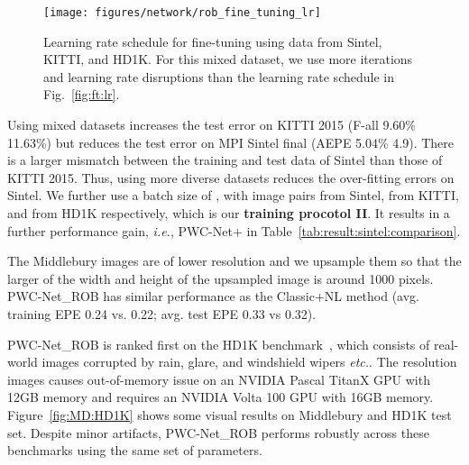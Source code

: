 \documentclass[10pt,journal,cspaper,compsoc]{IEEEtran}
\def\ie{\emph{i.e.}\xspace} \def\Ie{\emph{I.e.}\xspace}
\def\etc{\emph{etc.}\xspace} \def\vs{\emph{vs.}\xspace}
\begin{document}
	\begin{figure}[h]
		\begin{center}	
			\texttt{[image: figures/network/rob\_fine\_tuning\_lr]} 
		\end{center}
		\caption{Learning rate schedule for fine-tuning using data from Sintel, KITTI, and HD1K. For this mixed dataset, we use more iterations and learning rate disruptions than the learning rate schedule in Fig.~\ref{fig:ft:lr}.}
		\label{fig:rob:lr}
	\end{figure}
	
	
	Using mixed datasets increases the test error on KITTI 2015 (F-all 9.60\%  11.63\%) but reduces the test error on MPI Sintel final (AEPE 5.04\%  4.9). There is a larger mismatch between the training and test data of Sintel than those of KITTI 2015. Thus, using more diverse datasets reduces the over-fitting errors on Sintel. We further use a batch size of , with  image pairs from Sintel,   from KITTI, and  from HD1K respectively,  which is our \textbf{training procotol II}. It results in a further performance gain, \ie, PWC-Net+ in Table~\ref{tab:result:sintel:comparison}. 
	
	The Middlebury images are of lower resolution and we upsample them so that the larger of the width and height of the upsampled image is around 1000 pixels. PWC-Net\_ROB has similar performance as the Classic+NL method (avg. training EPE 0.24 vs. 0.22; avg. test EPE 0.33 vs 0.32). 

	PWC-Net\_ROB is ranked first on the HD1K benchmark~\cite{kondermann2016hci}, which consists of real-world images corrupted by rain, glare, and windshield wipers \etc. The  resolution images causes out-of-memory issue on an NVIDIA Pascal TitanX GPU with 12GB memory and requires an NVIDIA Volta 100 GPU with 16GB memory. Figure~\ref{fig:MD:HD1K} shows some visual results on Middlebury and HD1K test set. Despite minor artifacts, PWC-Net\_ROB performs robustly across these benchmarks using the same set of parameters. 
	
\end{document}
